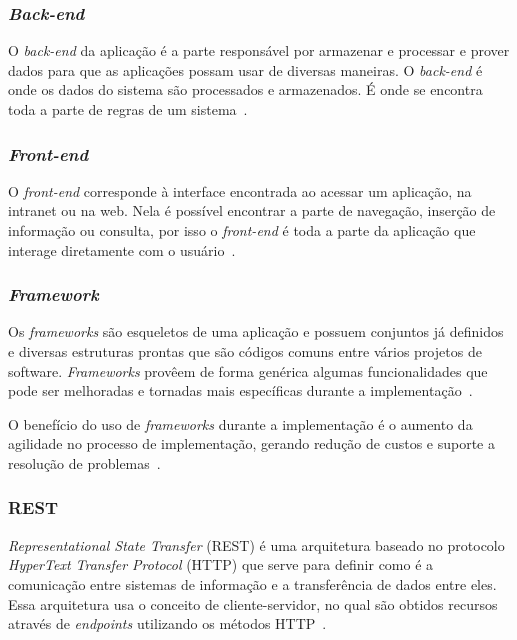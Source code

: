 \subsubsection{\textit{Back-end}}

O \textit{back-end} da aplicação é a parte responsável por armazenar e processar e prover dados para que as aplicações possam usar de diversas maneiras.
O \textit{back-end} é onde os dados do sistema são processados e armazenados.
É onde se encontra toda a parte de regras de um sistema~\cite{silva2017aplicaccao}.

\subsubsection{\textit{Front-end}}

O \textit{front-end} corresponde à interface encontrada ao acessar um aplicação, na intranet ou na web.
Nela é possível encontrar a parte de navegação, inserção de informação ou consulta, por isso o \textit{front-end} é toda a parte da aplicação que interage diretamente com o usuário~\cite{de2016estudo}.

\subsubsection{\textit{Framework}}

Os \textit{frameworks} são esqueletos de uma aplicação e possuem conjuntos já definidos e diversas estruturas prontas que são códigos comuns entre vários projetos de software.
\textit{Frameworks} provêem de forma genérica algumas funcionalidades que pode ser melhoradas e tornadas mais específicas durante a implementação~\cite{minetto2007frameworks}.

O benefício do uso de \textit{frameworks} durante a implementação é o aumento da agilidade no processo de implementação, gerando redução de custos e suporte a resolução de problemas~\cite{nash2003java}.

\subsubsection{REST}
 \textit{Representational State Transfer} (REST) é uma arquitetura baseado no protocolo \textit{HyperText Transfer Protocol} (HTTP) que serve para definir como é a comunicação entre sistemas de informação e a transferência de dados entre eles.
Essa arquitetura usa o conceito de cliente-servidor, no qual são obtidos recursos através de \textit{endpoints} utilizando os métodos HTTP~\cite{pacheco2018institutos}.

